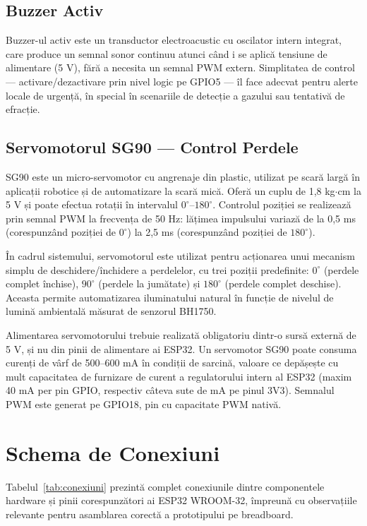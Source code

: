 \documentclass[12pt, twoside, a4paper]{report}
\begin{document}
\subsection{Buzzer Activ}

Buzzer-ul activ este un transductor electroacustic cu oscilator intern integrat, care
produce un semnal sonor continuu atunci când i se aplică tensiune de alimentare (5 V),
fără a necesita un semnal PWM extern. Simplitatea de control --- activare/dezactivare
prin nivel logic pe GPIO5 --- îl face adecvat pentru alerte locale de urgență, în
special în scenariile de detecție a gazului sau tentativă de efracție.

\subsection{Servomotorul SG90 --- Control Perdele}

SG90 este un micro-servomotor cu angrenaje din plastic, utilizat pe scară largă în
aplicații robotice și de automatizare la scară mică. Oferă un cuplu de 1,8 kg$\cdot$cm
la 5 V și poate efectua rotații în intervalul $0^{\circ}$--$180^{\circ}$. Controlul
poziției se realizează prin semnal PWM la frecvența de 50 Hz: lățimea impulsului variază
de la 0,5 ms (corespunzând poziției de $0^{\circ}$) la 2,5 ms (corespunzând poziției
de $180^{\circ}$).

În cadrul sistemului, servomotorul este utilizat pentru acționarea unui mecanism simplu
de deschidere/închidere a perdelelor, cu trei poziții predefinite: $0^{\circ}$ (perdele
complet închise), $90^{\circ}$ (perdele la jumătate) și $180^{\circ}$ (perdele complet
deschise). Aceasta permite automatizarea iluminatului natural în funcție de nivelul de
lumină ambientală măsurat de senzorul BH1750.

Alimentarea servomotorului trebuie realizată obligatoriu dintr-o sursă externă de 5 V,
și nu din pinii de alimentare ai ESP32. Un servomotor SG90 poate consuma curenți de
vârf de 500--600 mA în condiții de sarcină, valoare ce depășește cu mult capacitatea
de furnizare de curent a regulatorului intern al ESP32 (maxim 40 mA per pin GPIO,
respectiv câteva sute de mA pe pinul 3V3). Semnalul PWM este generat pe GPIO18, pin
cu capacitate PWM nativă.

\section{Schema de Conexiuni}
\label{sec:schema}

Tabelul~\ref{tab:conexiuni} prezintă complet conexiunile dintre componentele hardware
și pinii corespunzători ai ESP32 WROOM-32, împreună cu observațiile relevante pentru
asamblarea corectă a prototipului pe breadboard.
\end{document}
